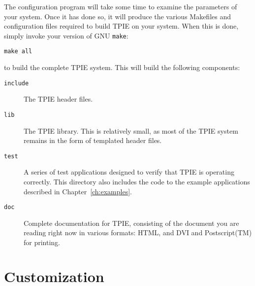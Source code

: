 The configuration program will take some time to
examine the parameters of your system.  Once it has done so, it will
produce the various Makefiles and configuration files required to
build TPIE on your system.  When this is done, simply invoke your version
of GNU \verb|make|:

\begin{verbatim}
make all
\end{verbatim}

to build the complete TPIE system.  This will build the following
components:

\begin{description}
\item[\verb|include|] The TPIE header files.
\item[\verb|lib|] The TPIE library.  This is relatively small, as most
  of the TPIE system remains in the form of templated header
  files.
\item[\verb|test|] A series of test applications designed to verify
  that TPIE is operating correctly.  This directory also includes the
  code to the example applications described in
  Chapter~\ref{ch:examples}.
\item[\verb|doc|] Complete documentation for TPIE, consisting of the
  document you are reading right now in various formats: HTML, and DVI and
  Postscript(TM) for printing.
\end{description}





\section{Customization}

